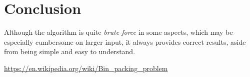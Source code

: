 \section{Conclusion}
Although the algorithm is quite \textit{brute-force} in some aspects,
which may be especially cumbersome on larger input,
it always provides correct results, aside from
being simple and easy to understand.

\newpage
\begin{thebibliography}{9}
	\url{https://en.wikipedia.org/wiki/Bin_packing_problem}
\end{thebibliography}


